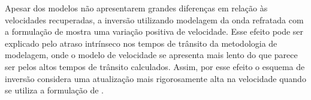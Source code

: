 Apesar dos modelos não apresentarem grandes diferenças em relação às velocidades recuperadas, a inversão utilizando modelagem da onda refratada com a formulação de  mostra uma variação positiva de velocidade. Esse efeito pode ser explicado pelo atraso intrínseco nos tempos de trânsito da metodologia de modelagem, onde o modelo de velocidade se apresenta mais lento do que parece ser pelos altos tempos de trânsito calculados. Assim, por esse efeito o esquema de inversão considera uma atualização mais rigorosamente alta na velocidade quando se utiliza a formulação de .    

